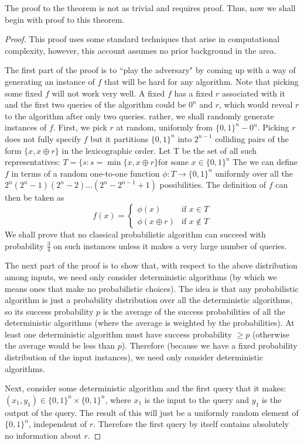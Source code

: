 The proof to the theorem is not as trivial and requires proof. Thus, now we shall begin with proof to this theorem.
\begin{proof}
    This proof uses some standard techniques that arise in computational complexity, however, this account assumes no prior background in the area.

    The first part of the proof is to ``play the adversary" by coming up with a way of generating an instance of $f$ that will be hard for any algorithm. Note that picking some fixed $f$ will not work very well. A fixed $f$ has a fixed $r$ associated with it and the first two queries of the algorithm could be $0^n$ and $r$, which would reveal $r$ to the algorithm after only two queries. rather, we shall randomly generate instances of $f$. First, we pick $r$ at random, uniformly from $\{0,1\}^n -0^n$. Picking $r$ does not fully specify $f$ but it partitions $\{0,1\}^n$ into $2^{n-1}$ colliding pairs of the form $\{x,x\oplus r\}$ in the lexicographic order. Let T be the set of all such representatives: $T=\{s:s=\min \{x,x\oplus r\} \text{for some } x \in \{0,1\}^n$ The we can define $f$ in terms of a random one-to-one function $\phi:T\rightarrow \{0,1\}^n$ uniformly over all the $2^n(2^n-1)(2^n-2)\ldots(2^n-2^{n-1}+1)$ possibilities. The definition of $f$ can then be taken as
    \[
    f(x) = \begin{cases} \phi(x) & \text{if } x \in T \\ 
    \phi(x \oplus r) &\text{if } x \notin T \end{cases}
    \]
    We shall prove that no classical probabilistic algorithm can succeed with probability $\frac{3}{4}$ on such instances unless it makes a very large number of queries.

    The next part of the proof is to show that, with respect to the above distribution among inputs, we need only consider deterministic algorithms (by which we means ones that make no probabilistic choices). The idea is that any probabilistic algorithm is just a probability distribution over all the deterministic algorithms, so its success probability $p$ is the average of the success probabilities of all the deterministic algorithms (where the average is weighted by the probabilities). At least one deterministic algorithm must have success probability $\geq p$ (otherwise the average would be less than $p$). Therefore (because we have a fixed probability distribution of the input instances), we need only consider deterministic algorithms.

    Next, consider some deterministic algorithm and the first query that it makes: $(x_1,y_1) \in \{0,1\}^n \times \{0,1\}^n$, where $x_1$ is the input to the query and $y_1$ is the output of the query. The result of this will just be a uniformly random element of $\{0,1\}^n$, independent of $r$. Therefore the first query by itself contains absolutely no information about $r$.


\end{proof}
